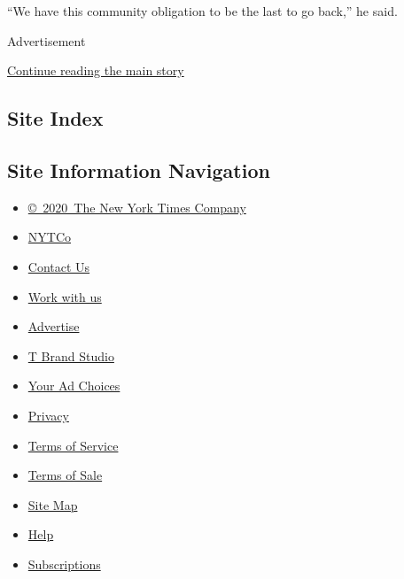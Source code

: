 ``We have this community obligation to be the last to go back,'' he
said.

Advertisement

\protect\hyperlink{after-bottom}{Continue reading the main story}

\hypertarget{site-index}{%
\subsection{Site Index}\label{site-index}}

\hypertarget{site-information-navigation}{%
\subsection{Site Information
Navigation}\label{site-information-navigation}}

\begin{itemize}
\tightlist
\item
  \href{https://help.nytimes3xbfgragh.onion/hc/en-us/articles/115014792127-Copyright-notice}{©~2020~The
  New York Times Company}
\end{itemize}

\begin{itemize}
\tightlist
\item
  \href{https://www.nytco.com/}{NYTCo}
\item
  \href{https://help.nytimes3xbfgragh.onion/hc/en-us/articles/115015385887-Contact-Us}{Contact
  Us}
\item
  \href{https://www.nytco.com/careers/}{Work with us}
\item
  \href{https://nytmediakit.com/}{Advertise}
\item
  \href{http://www.tbrandstudio.com/}{T Brand Studio}
\item
  \href{https://www.nytimes3xbfgragh.onion/privacy/cookie-policy\#how-do-i-manage-trackers}{Your
  Ad Choices}
\item
  \href{https://www.nytimes3xbfgragh.onion/privacy}{Privacy}
\item
  \href{https://help.nytimes3xbfgragh.onion/hc/en-us/articles/115014893428-Terms-of-service}{Terms
  of Service}
\item
  \href{https://help.nytimes3xbfgragh.onion/hc/en-us/articles/115014893968-Terms-of-sale}{Terms
  of Sale}
\item
  \href{https://spiderbites.nytimes3xbfgragh.onion}{Site Map}
\item
  \href{https://help.nytimes3xbfgragh.onion/hc/en-us}{Help}
\item
  \href{https://www.nytimes3xbfgragh.onion/subscription?campaignId=37WXW}{Subscriptions}
\end{itemize}
